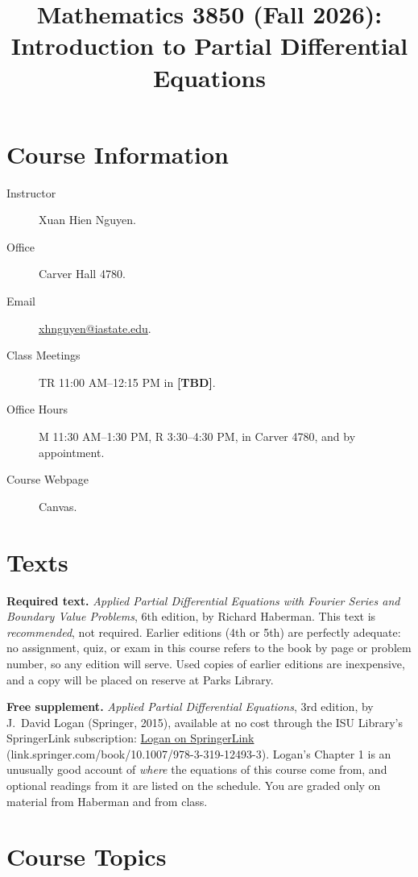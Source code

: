 \documentclass[11pt]{amsart}
\title{Mathematics 3850 (Fall 2026):\\ Introduction to Partial Differential Equations}
\newcommand{\TBD}{\textbf{[TBD]}}
\begin{document}
\maketitle

\begin{raggedright}

\section{Course Information}

\begin{description}
\item[Instructor] Xuan Hien Nguyen.
\item[Office] Carver Hall 4780.
\item[Email] \href{mailto:xhnguyen@iastate.edu}{xhnguyen@iastate.edu}.
\item[Class Meetings] TR 11:00 AM--12:15 PM in \TBD.
\item[Office Hours] M 11:30 AM--1:30 PM, R 3:30--4:30 PM, in Carver 4780, and by
  appointment.
\item[Course Webpage] Canvas.
\end{description}

\section{Texts}

\textbf{Required text.} \emph{Applied Partial Differential Equations with Fourier
Series and Boundary Value Problems}, 6th edition, by Richard Haberman.  This text is
\emph{recommended}, not required.  Earlier editions (4th or 5th) are perfectly
adequate: no assignment, quiz, or exam in this course refers to the book by page or
problem number, so any edition will serve.  Used copies of earlier editions are
inexpensive, and a copy will be placed on reserve at Parks Library.

\textbf{Free supplement.} \emph{Applied Partial Differential Equations}, 3rd edition,
by J.\ David Logan (Springer, 2015), available at no cost through the ISU Library's
SpringerLink subscription:
\href{https://link.springer.com/book/10.1007/978-3-319-12493-3}{Logan on SpringerLink}
(link.springer.com/book/10.1007/978-3-319-12493-3).  Logan's Chapter 1 is an unusually
good account of \emph{where} the equations of this course come from, and optional
readings from it are listed on the schedule.  You are graded only on material from
Haberman and from class.

\section{Course Topics}


\end{raggedright}
\end{document}
